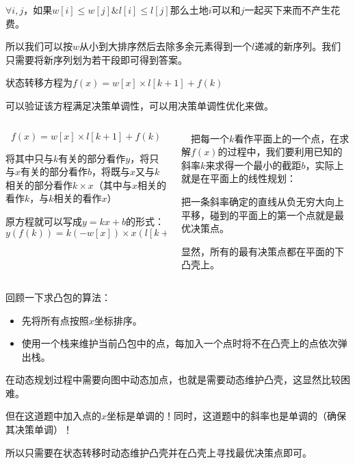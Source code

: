 \documentclass[9pt,dvipsnames,table,UTF8,aspectratio=169]{beamer}
\begin{document}
\begin{frame}
	$\forall i, j$，如果$w[i] \le w[j] \& l[i] \le l[j]$那么土地$i$可以和$j$一起买下来而不产生花费。
	
	所以我们可以按$w$从小到大排序然后去除多余元素得到一个$l$递减的新序列。我们只需要将新序列划为若干段即可得到答案。

	\pause
	状态转移方程为$f(x) = w[x] \times l[k + 1] + f(k)$

	\pause
	可以验证该方程满足决策单调性，可以用决策单调性优化来做。
\end{frame}

\begin{frame}
	\begin{columns}
		\begin{column}{0.5\textwidth}
			$$f(x) = w[x] \times l[k + 1] + f(k)$$

			将其中只与$k$有关的部分看作$y$，将只与$x$有关的部分看作$b$，将既与$x$又与$k$相关的部分看作$k \times x$（其中与$x$相关的看作$k$，与$k$相关的看作$x$）

			原方程就可以写成$y = kx + b$的形式：$$y(f(k)) = k(-w[x]) \times x(l[k + 1]) + b(f(x))$$
		\end{column}
		\begin{column}{0.5\textwidth}
			　把每一个$k$看作平面上的一个点，在求解$f(x)$的过程中，我们要利用已知的斜率$k$来求得一个最小的截距$b$，实际上就是在平面上的线性规划：

			把一条斜率确定的直线从负无穷大向上平移，碰到的平面上的第一个点就是最优决策点。

			显然，所有的最有决策点都在平面的下凸壳上。
		\end{column}
	\end{columns}
\end{frame}

\begin{frame}
	回顾一下求凸包的算法：
	\begin{itemize}
		\item 先将所有点按照$x$坐标排序。
		\item 使用一个栈来维护当前凸包中的点，每加入一个点时将不在凸壳上的点依次弹出栈。
	\end{itemize}

	\pause
	在动态规划过程中需要向图中动态加点，也就是需要动态维护凸壳，这显然比较困难。

	\pause
	但在这道题中加入点的$x$坐标是单调的！同时，这道题中的斜率也是单调的（确保其决策单调）！

	\pause
	所以只需要在状态转移时动态维护凸壳并在凸壳上寻找最优决策点即可。
\end{frame}
\end{document}

